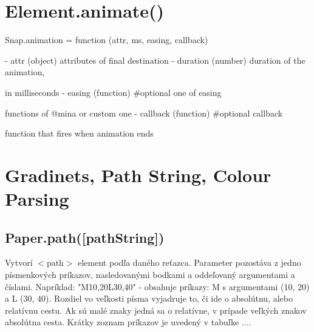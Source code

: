 \section{Element.animate()}
 Snap.animation = function (attr, ms, easing, callback) 

- attr (object) attributes of final destination
- duration (number) duration of the animation, 

in milliseconds
- easing (function) \#optional one of easing 

functions of @mina or custom one
- callback (function) \#optional callback 

function that fires when animation ends


\section{Gradinets, Path String, Colour Parsing}



\subsection{Paper.path([pathString])}
Vytvorí $<$path$>$ element podľa daného reťazca. Parameter pozostáva z jedno písmenkových príkazov, nasledovanými bodkami a oddeľovaný argumentami a číslami. 
Napríklad: "M10,20L30,40" - obsahuje príkazy: M s argumentami (10, 20) a L (30, 40). Rozdiel vo veľkosti písma vyjadruje to, či ide o absolútnu, alebo relatívnu cestu. Ak sú malé znaky jedná sa o relatívne, v prípade veľkých znakov absolútna cesta. 
Krátky zoznam príkazov je uvedený v tabuľke ....

